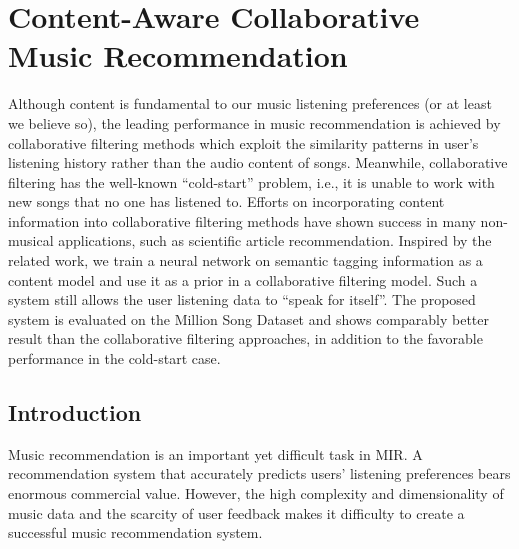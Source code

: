

\chapter{Content-Aware Collaborative Music Recommendation}\label{chpt:content}


Although content is fundamental to our music listening preferences (or at least we believe so), the leading performance in music recommendation is achieved by collaborative filtering methods which exploit the similarity patterns in user's listening history rather than the audio content of songs. Meanwhile, collaborative filtering has the well-known ``cold-start'' problem, i.e., it is unable to work with new songs that no one has listened to.  Efforts on incorporating content information into collaborative filtering methods have shown success in many non-musical applications, such as scientific article recommendation. Inspired by the related work, we train a neural network on semantic tagging information as a content model and use it as a prior in a collaborative filtering model. Such a system still allows the user listening data to ``speak for itself''. The proposed system is evaluated on the Million Song Dataset and shows comparably better result than the collaborative filtering approaches, in addition to the favorable performance in the cold-start case. 

%
\section{Introduction}\label{chpt:content:sec:intro}
Music recommendation is an important yet difficult task in \gls{MIR}. A recommendation system that accurately predicts users' listening preferences bears enormous commercial value. However, the high complexity and dimensionality of music data and the scarcity of user feedback makes it difficulty to create a successful music recommendation system. 

